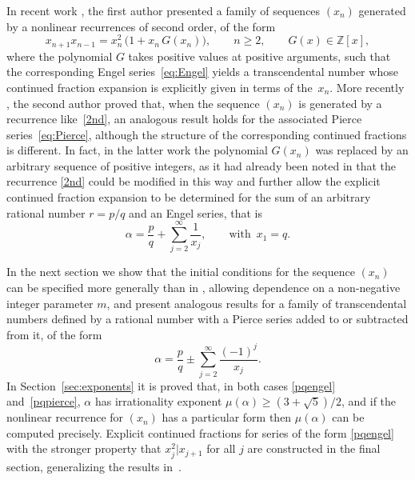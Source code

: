 \documentclass[10pt, a4paper]{amsart}
\numberwithin{equation}{section}
\newcommand\al{{\alpha}}
\theoremstyle{plain}
\theoremstyle{definition}
\newcommand{\Z}{\mathbb{Z}}
\begin{document}
In recent work \cite{Hone1}, %
the first author presented a family of sequences $(x_n)$ 
generated by a nonlinear recurrences of second order, 
of the form 
\begin{equation}
\label{2nd} 
x_{n+1}x_{n-1} = x_n^2 \,\Big(1+x_n\,G(x_n)\Big), \qquad n\geq 2,  \qquad G(x)\in \Z [x], 
\end{equation} 
where the polynomial $G$ takes positive values at positive arguments, such 
that the corresponding Engel series~\eqref{eq:Engel} yields a transcendental number 
whose 
continued fraction expansion is explicitly given in terms of the~$x_n$. 
More recently \cite{Var2}, the second 
author proved that, when the sequence $(x_n)$ is generated by a recurrence like~\eqref{2nd}, 
an analogous result holds for the associated Pierce series~\eqref{eq:Pierce}, 
although the structure of the corresponding continued fractions is different. 
In fact, in the latter 
work the polynomial $G(x_n)$  was replaced by an arbitrary sequence of 
positive integers,  as it had already been noted in \cite{Hone3} that 
the recurrence \eqref{2nd} could be modified in this way and further allow the 
explicit continued fraction expansion to be determined for the sum 
of an arbitrary rational number $r=p/q$ and an Engel series, that is 
\begin{equation}
\label{pqengel} 
\al = \frac{p}{q} + \sum_{j=2}^\infty  \frac{1}{x_j}, \qquad 
\text{with}\,\,\, x_1=q.
\end{equation}   

In the next section we show that 
the initial conditions for the sequence $(x_n)$ can be specified 
more generally than  in %
\cite{Hone3},   
allowing dependence on a non-negative integer parameter $m$, 
and present analogous 
results for a  
family of transcendental numbers defined by a rational number with 
a Pierce series added to or subtracted from it, of the form 
\begin{equation}
\label{pqpierce} 
\al = \frac{p}{q} \pm \sum_{j=2}^\infty  \frac{(-1)^j}{x_j}.
\end{equation} 
In Section~\ref{sec:exponents} it is proved that, 
in both cases \eqref{pqengel} and~\eqref{pqpierce},  %
$\al$ has 
irrationality exponent $\mu(\al)\geq (3+\sqrt{5})/2$, and 
if the 
nonlinear recurrence for $(x_n)$  has a particular form then 
$\mu(\al)$ can be computed precisely. 
Explicit continued fractions for series of the form \eqref{pqengel} 
with the stronger property that $x_j^2|x_{j+1}$
for all $j$ are constructed in 
the final section, generalizing the results in~\cite{Hone2}. 
\end{document}
